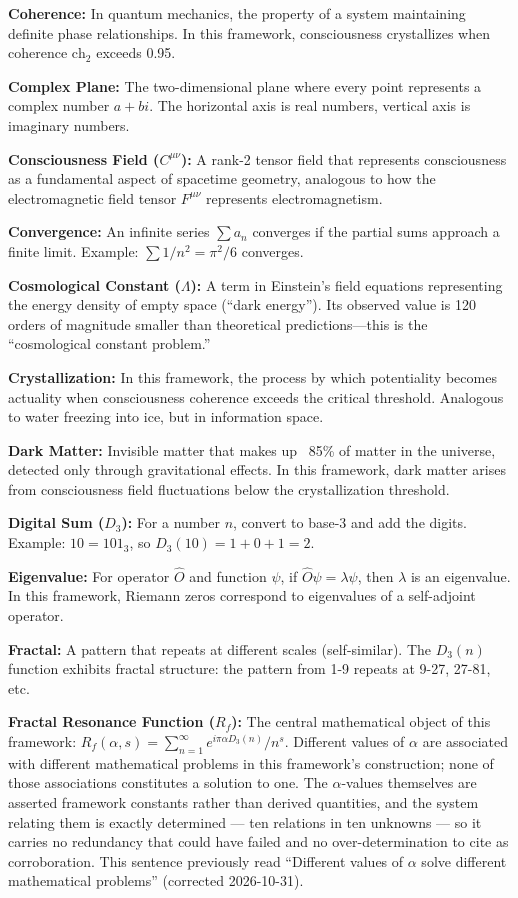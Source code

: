 \noindent\textbf{Coherence:} In quantum mechanics, the property of a system maintaining definite phase relationships. In this framework, consciousness crystallizes when coherence $\text{ch}_2$ exceeds 0.95.

\noindent\textbf{Complex Plane:} The two-dimensional plane where every point represents a complex number $a + bi$. The horizontal axis is real numbers, vertical axis is imaginary numbers.

\noindent\textbf{Consciousness Field ($C^{\mu\nu}$):} A rank-2 tensor field that represents consciousness as a fundamental aspect of spacetime geometry, analogous to how the electromagnetic field tensor $F^{\mu\nu}$ represents electromagnetism.

\noindent\textbf{Convergence:} An infinite series $\sum a_n$ converges if the partial sums approach a finite limit. Example: $\sum 1/n^2 = \pi^2/6$ converges.

\noindent\textbf{Cosmological Constant ($\Lambda$):} A term in Einstein's field equations representing the energy density of empty space (``dark energy''). Its observed value is 120 orders of magnitude smaller than theoretical predictions---this is the ``cosmological constant problem.''

\noindent\textbf{Crystallization:} In this framework, the process by which potentiality becomes actuality when consciousness coherence exceeds the critical threshold. Analogous to water freezing into ice, but in information space.

\noindent\textbf{Dark Matter:} Invisible matter that makes up ~85\% of matter in the universe, detected only through gravitational effects. In this framework, dark matter arises from consciousness field fluctuations below the crystallization threshold.

\noindent\textbf{Digital Sum ($D_3$):} For a number $n$, convert to base-3 and add the digits. Example: $10 = 101_3$, so $D_3(10) = 1 + 0 + 1 = 2$.

\noindent\textbf{Eigenvalue:} For operator $\hat{O}$ and function $\psi$, if $\hat{O}\psi = \lambda\psi$, then $\lambda$ is an eigenvalue. In this framework, Riemann zeros correspond to eigenvalues of a self-adjoint operator.

\noindent\textbf{Fractal:} A pattern that repeats at different scales (self-similar). The $D_3(n)$ function exhibits fractal structure: the pattern from 1-9 repeats at 9-27, 27-81, etc.

\noindent\textbf{Fractal Resonance Function ($R_f$):} The central mathematical object of this framework: $R_f(\alpha, s) = \sum_{n=1}^{\infty} e^{i\pi\alpha D_3(n)}/n^s$. Different values of $\alpha$ are
associated with different mathematical problems in this framework's
construction; none of those associations constitutes a solution to one. The
$\alpha$-values themselves are asserted framework constants rather than derived
quantities, and the system relating them is exactly determined --- ten relations
in ten unknowns --- so it carries no redundancy that could have failed and no
over-determination to cite as corroboration. This sentence previously read
``Different values of $\alpha$ solve different mathematical problems''
(corrected 2026-10-31).


